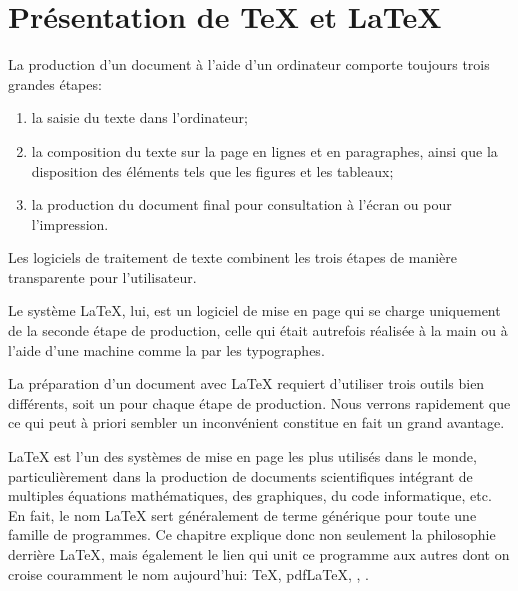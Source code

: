 
\chapter{Présentation de {\TeX} et {\LaTeX}}
\label{chap:presentation}

La production d'un document à l'aide d'un ordinateur comporte toujours
trois grandes étapes:
\begin{enumerate}
\item la saisie du texte dans l'ordinateur;
\item la composition du texte sur la page en lignes et en paragraphes,
  ainsi que la disposition des éléments tels que les figures et les
  tableaux;
\item la production du document final pour consultation à l'écran ou
  pour l'impression.
\end{enumerate}
Les logiciels de traitement de texte combinent les trois étapes de
manière transparente pour l'utilisateur.

Le système {\LaTeX}, lui, est un logiciel de mise en page qui se
charge uniquement de la seconde étape de production, celle qui était
autrefois réalisée à la main ou à l'aide d'une machine comme la
 par les
typographes.

La préparation d'un document avec {\LaTeX} requiert d'utiliser trois
outils bien différents, soit un pour chaque étape de production. Nous
verrons rapidement que ce qui peut à priori sembler un inconvénient
constitue en fait un grand avantage.

{\LaTeX} est l'un des systèmes de mise en page les plus utilisés dans
le monde, particulièrement dans la production de documents
scientifiques intégrant de multiples équations mathématiques, des
graphiques, du code informatique, etc. En fait, le nom {\LaTeX} sert
généralement de terme générique pour toute une famille de programmes.
Ce chapitre explique donc non seulement la philosophie derrière
{\LaTeX}, mais également le lien qui unit ce programme aux autres dont
on croise couramment le nom aujourd'hui: {\TeX}, pdf{\LaTeX},
{\XeLaTeX}, {\LuaLaTeX}.


